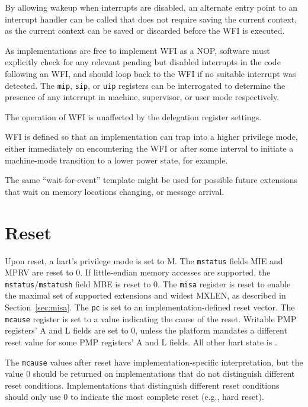 \begin{commentary}
By allowing wakeup when interrupts are disabled, an alternate entry
point to an interrupt handler can be called that does not require
saving the current context, as the current context can be saved or
discarded before the WFI is executed.

As implementations are free to implement WFI as a NOP, software must
explicitly check for any relevant pending but disabled interrupts in
the code following an WFI, and should loop back to the WFI if no
suitable interrupt was detected.  The {\tt mip}, {\tt sip},
or {\tt uip} registers can be interrogated to determine the presence
of any interrupt in machine, supervisor, or user mode
respectively.

The operation of WFI is unaffected by the delegation register settings.

WFI is defined so that an implementation can trap into a higher
privilege mode, either immediately on encountering the WFI or after
some interval to initiate a machine-mode transition to a lower power
state, for example.
\end{commentary}

\begin{commentary}
The same ``wait-for-event'' template might be used for possible future
extensions that wait on memory locations changing, or message
arrival.
\end{commentary}

\section{Reset}
\label{sec:reset}

Upon reset, a hart's privilege mode is set to M.  The {\tt mstatus} fields MIE
and MPRV are reset to 0.
If little-endian memory accesses are supported, the {\tt mstatus}/{\tt mstatush}
field MBE is reset to 0.
The {\tt misa} register is reset to enable the maximal set of supported
extensions and widest MXLEN, as described in Section~\ref{sec:misa}.
The {\tt pc} is set to an implementation-defined
reset vector.  The {\tt mcause} register is set to a value indicating the
cause of the reset.
Writable PMP registers' A and L fields are set to 0, unless the platform
mandates a different reset value for some PMP registers' A and L fields.
All other hart state is \unspecified.

The {\tt mcause} values after reset have implementation-specific
interpretation, but the value 0 should be returned on implementations
that do not distinguish different reset conditions. Implementations
that distinguish different reset conditions should only use 0 to
indicate the most complete reset (e.g., hard reset).

